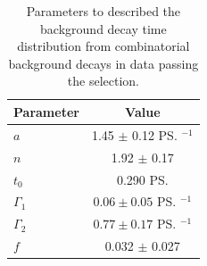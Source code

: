 {\begin{table}[htbp]
\begin{center}
\begin{tabular}{lc}
\hline
Parameter & Value \\
\hline
$a$ & 1.45 $\pm$ 0.12 \ps$^{-1}$\\
$n$ & 1.92 $\pm$ 0.17 \\
$t_{0}$ & 0.290 \ps \\
$\Gamma_{1}$ & $0.06 \pm 0.05$ \ps$^{-1}$ \\ 
$\Gamma_{2}$ & $0.77 \pm 0.17$ \ps$^{-1}$ \\
$f$ & 0.032 $\pm$ 0.027 \\
\hline
\end{tabular}
\vspace{0.7cm}             
\caption{Parameters to described the background decay time distribution from combinatorial background decays in data passing the \bhh selection.}
\label{tab:bkgparams}
\end{center}
\vspace{-1.0cm}                                                                                                                                               
\end{table}

}
